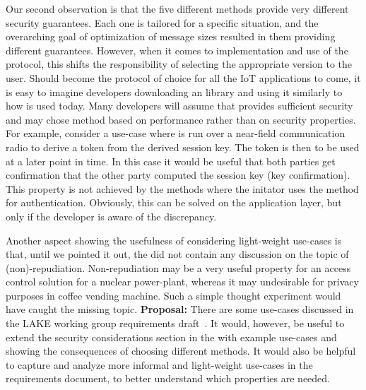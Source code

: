 \documentclass[runningheads,draft]{llncs}
\begin{document}
Our second observation is that the five different methods provide very different
security guarantees.
%
Each one is tailored for a specific situation, and the overarching goal of
optimization of message sizes resulted in them providing different guarantees.
%
However, when it comes to implementation and use of the protocol, this shifts the
responsibility of selecting the appropriate version to the user.
%
Should \mEdhoc{} become the protocol of choice for all the IoT applications to
come, it is easy to imagine developers downloading an \mEdhoc{} library and using
it similarly to how \mTls{} is used today.
%
Many developers will assume that \mEdhoc{} provides sufficient security and may
chose method based on performance rather than on security properties.
%
For example, consider a use-case where \mEdhoc{} is run over a near-field
communication radio to derive a token from the derived session key.
%
The token is then to be used at a later point in time.
%
In this case it would be useful that both parties get confirmation that the
other party computed the session key (key confirmation).
%
This property is not achieved by the \mEdhoc{} methods where the initator uses the
\mStat{} method for authentication.
%
Obviously, this can be solved on the application layer, but only if the
developer is aware of the discrepancy.
%

Another aspect showing the usefulness of considering \mEdhoc{} light-weight
use-cases is that, until we pointed it out, the \mSpec{} did not contain
any discussion on the topic of (non)-repudiation.
%
Non-repudiation may be a very useful property for an access control
solution for a nuclear power-plant, whereas it may undesirable for privacy
purposes in coffee vending machine.
%
Such a simple thought experiment would have caught the missing topic.
%
\textbf{Proposal:} There are some use-cases discussed in the LAKE working
group requirements draft~\cite{ietf-lake-reqs-04}.
%
It would, however, be useful to extend the security considerations section in
the \mSpec{} with example use-cases and showing the consequences of
choosing different methods.
%
It would also be helpful to capture and analyze more informal and light-weight
use-cases in the requirements document, to better understand which properties
are needed.

\end{document}
